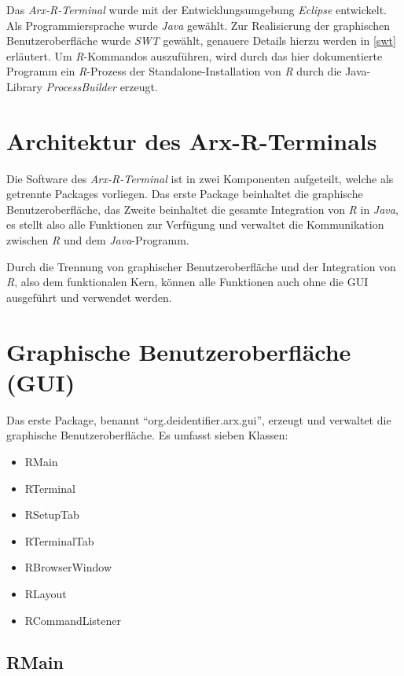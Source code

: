 \documentclass[a4paper, 12pt]{report} %
\begin{document}
Das \textit{Arx-R-Terminal} wurde mit der Entwicklungsumgebung \textit{Eclipse} entwickelt.
Als Programmiersprache wurde \textit{Java} gewählt. Zur Realisierung der graphischen Benutzeroberfläche wurde \textit{SWT} gewählt, genauere Details hierzu werden in \ref{swt} erläutert.
Um \textit{R}-Kommandos auszuführen, wird durch das hier dokumentierte Programm ein \textit{R}-Prozess der Standalone-Installation von \textit{R} durch die Java-Library \textit{ProcessBuilder} erzeugt.


\section{Architektur des Arx-R-Terminals}

Die Software des \textit{Arx-R-Terminal} ist in zwei Komponenten aufgeteilt, welche als getrennte Packages vorliegen. Das erste Package beinhaltet die graphische Benutzeroberfläche, das Zweite beinhaltet die gesamte Integration von \textit{R} in \textit{Java}, es stellt also alle Funktionen zur Verfügung und verwaltet die Kommunikation zwischen \textit{R} und dem \textit{Java}-Programm.

Durch die Trennung von graphischer Benutzeroberfläche und der Integration von \textit{R}, also dem funktionalen Kern, können alle Funktionen auch ohne die GUI ausgeführt und verwendet werden.

\section{Graphische Benutzeroberfläche (GUI)}\label{gui}

\begin{samepage}

Das erste Package, benannt "`org.deidentifier.arx.gui"', erzeugt und verwaltet die graphische Benutzeroberfläche. Es umfasst sieben Klassen:
\begin{itemize}
	\item RMain
	\item RTerminal
	\item RSetupTab
	\item RTerminalTab
	\item RBrowserWindow
	\item RLayout
	\item RCommandListener
\end{itemize}
\end{samepage}

\subsection{RMain}
\end{document}

